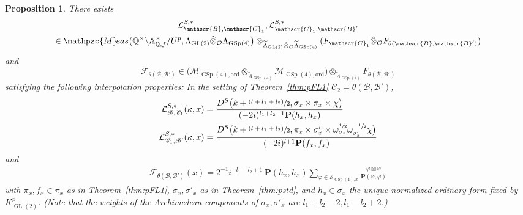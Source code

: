 \documentclass[JEP,XML,SOM,Unicode,published]{cedram}
\newcommand{\psfrac}[2]{\sfrac{(#1)}{#2}}
\theoremstyle{plain}
\newtheorem{prop}[thm]{Proposition}
\theoremstyle{remark}
\newcommand{\bA}{\mathbb{A}}
\newcommand{\bQ}{\mathbb{Q}}
\newcommand{\cF}{\mathcal{F}}
\newcommand{\cL}{\mathcal{L}}
\newcommand{\cM}{\mathcal{M}}
\newcommand{\cO}{\mathcal{O}}
\newcommand{\sB}{\mathscr{B}}
\newcommand{\sC}{\mathscr{C}}
\newcommand{\sS}{\mathscr{S}}
\newcommand{\bfP}{\mathbf{P}}
\DeclareMathOperator{\GL}{GL}
\DeclareMathOperator{\GSp}{GSp}
\newcommand{\Meas}{\mathpzc{M}\mkern-2mu eas}
\newcommand{\ord}{\mathrm{ord}}
\let\wh\widehat
\let\wt\widetilde
\begin{document}
\begin{prop}\label{prop:modpLf}
There exists\vspace*{-5pt}
\begin{multline*}
\cL^{S,\ast}_{\sB,\sC_1},\cL^{S,\ast}_{\sC_1,\sB'}\\
\in\Meas\bigl(\bQ^\times\backslash\bA^\times_{\bQ,f}/U^p,\Lambda_{\GL(2)}\wh{\otimes}_{\cO} \Lambda_{\GSp(4)}\bigr)\otimes_{\wt{\Lambda}_{\GL(2)}\hat{\otimes}_\cO\wt{\Lambda}_{\GSp(4)}} (F_{\sC_1}\hat{\otimes}_\cO F_{\theta(\sB,\sB')})
\end{multline*}
and\vspace*{-5pt}
\[
\cF_{\theta(\sB,\sB')} \in \bigl(\cM_{\GSp(4),\ord}\otimes_{\wt{\Lambda}_{\GSp(4)}} \cM_{\GSp(4),\ord}\bigr)\otimes_{\wt{\Lambda}_{\GSp(4)}} F_{\theta(\sB,\sB')}
\]
satisfying the following interpolation properties: In the setting of Theorem~\ref{thm:pFL1} $\sC_2=\theta(\sB,\sB')$,\vspace*{-5pt}
\begin{align*}
\cL^{S,\ast}_{\sB,\sC_1}(\kappa,x)&=\frac{D^S\bigl(k+\psfrac{l+l_1+l_2}{2},\sigma_x\times\pi_x\times\chi\bigr)}{(-2i)^{l_1+l_2-1}\bfP(h_x,h_x)}\\
\cL^{S,\ast}_{\sC_1,\sB'}(\kappa,x)&=\frac{D^S\bigl(k+\psfrac{l+l_1+l_2}{2},\pi_x\times\sigma'_x\times\omega^{\sfrac{1}{2}}_{\sigma_x}\omega^{-\sfrac{1}{2}}_{\sigma'_x}\chi\bigr)}{(-2i)^{l+1}\bfP(f_x,f_x)}
\end{align*}
and
\begin{align*}
\cF_{\theta(\sB,\sB')}(x)= 2^{-1}i^{-l_1-l_2+1}\,\bfP(h_x,h_x)\sum_{\varphi\in\sS_{\GSp(4),x}} \frac{\varphi\boxtimes\varphi}{\bfP(\varphi,\varphi)}
\end{align*}
with $\pi_x,f_x\in\pi_x$ as in Theorem~\ref{thm:pFL1}, $\sigma_x,\sigma'_x$ as in Theorem~\ref{thm:pstd}, and $h_x\in\sigma_x$ the unique normalized ordinary form fixed by $K^p_{\GL(2)}$. (Note that the weights of the Archimedean components of $\sigma_x,\sigma'_x$ are $l_1+l_2-2,l_1-l_2+2$.)
\end{prop}
\end{document}
